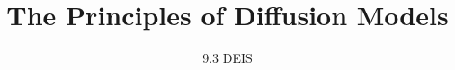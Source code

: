 
\title{The Principles of Diffusion Models}
\subtitle{9.3 DEIS}


\begin{frame}
    \titlepage
\end{frame}


